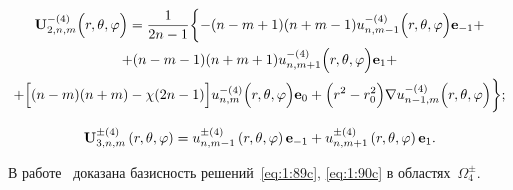 \begin{multline}\label{eq:1:93}
{\bf{U}}_{2,n,m}^{ - (4)}\Big( {r,\theta ,\varphi } \Big) =  \frac{1}{{2n - 1}}\bigg\{ { - (n - m + 1)(n + m - 1)u_{n,m - 1}^{ - (4)}\Big( {r,\theta ,\varphi } \Big){{\bf{e}}_{ - 1}} + } \\
+ (n - m - 1)(n + m + 1)u_{n,m + 1}^{ - (4)}\Big( {r,\theta ,\varphi } \Big){{\bf{e}}_1} + \\
+ \Big[ {(n - m)(n + m) - \chi (2n - 1)} \Big] u_{n,m}^{ - (4)}\Big( {r,\theta ,\varphi } \Big){{\bf{e}}_0} + \Big( {{r^2} - r_0^2} \Big)\nabla u_{n - 1,m}^{ - (4)}\Big( {r,\theta ,\varphi } \Big) \bigg\};
\end{multline}

\begin{equation}\label{eq:1:94}
{\bf{U}}_{3,n,m}^{ \pm (4)}\left( {r,\theta ,\varphi } \right) =  u_{n,m - 1}^{ \pm (4)}\left( {r,\theta ,\varphi } \right){{\bf{e}}_{ - 1}} + u_{n,m + 1}^{ \pm (4)}\left( {r,\theta ,\varphi } \right){{\bf{e}}_1}.
\end{equation}

В работе~\cite{Nikolaev1998} доказана базисность решений~\eqref{eq:1:89c}, \eqref{eq:1:90c} в областях~$\Omega_4^\pm$.

